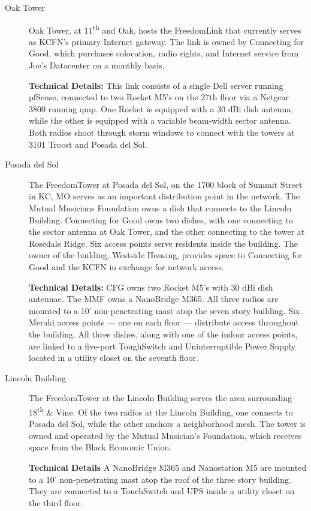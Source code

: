 \begin{description}
\item[Oak Tower]
Oak Tower, at 11\textsuperscript{th} and Oak, hosts the FreedomLink that currently serves as
KCFN's primary Internet gateway. The link is owned by Connecting
for Good, which purchases colocation, radio rights, and Internet service from
Joe's Datacenter on a monthly basis. \par
{\bf Technical Details:} This link consists of a single Dell server running
pfSense, connected to two Rocket M5's 
on the 27th floor via a Netgear 3800 running qmp. One Rocket is equipped with a
30 dBi dish antenna, while the other is equipped with a variable beam-width
sector antenna. Both radios shoot through storm 
windows to connect with the towers at 3101 Troost and Posada del Sol.

\item[Posada del Sol]
The FreedomTower at Posada del Sol, on the 1700 block of Summit Street in KC, MO
serves as an important distribution point in the network. The Mutual Musicians Foundation owns a dish that
connects to the Lincoln Building. Connecting for Good owns two dishes, with
one connecting to the sector antenna at Oak Tower, and the other connecting to the tower at
Rosedale Ridge. Six access points serve residents inside the building. The owner
of the building, Westside Housing, provides space to Connecting for Good and the
KCFN in exchange for network access. \par
{\bf Technical Details:} CFG owns two Rocket M5's with 30 dBi dish antennae. The
MMF owns a NanoBridge M365. All three radios are mounted to a 10'
non-penetrating mast atop the seven story building. Six Meraki access points ---
one on each floor --- distribute access throughout the building.  All three dishes, along with
one of the indoor access points, are linked to a five-port ToughSwitch and 
Uninterruptible Power Supply located in a utility closet on the seventh floor.

\item[Lincoln Building]
The FreedomTower at the Lincoln Building serves the area surrounding
18\textsuperscript{th}
\& Vine. Of the two radios at the Lincoln Building, one connects to Posada del
Sol, while the other anchors a neighborhood mesh. The tower is owned and operated by the Mutual Musician's Foundation, which
receives space from the Black Economic Union. \par
{\bf Technical Details} A NanoBridge M365 and Nanostation M5 are mounted to a 10' non-penetrating
mast atop the roof of the three story building. They are connected to a
TouchSwitch 
and UPS inside a utility closet on the third floor.


\end{description}
